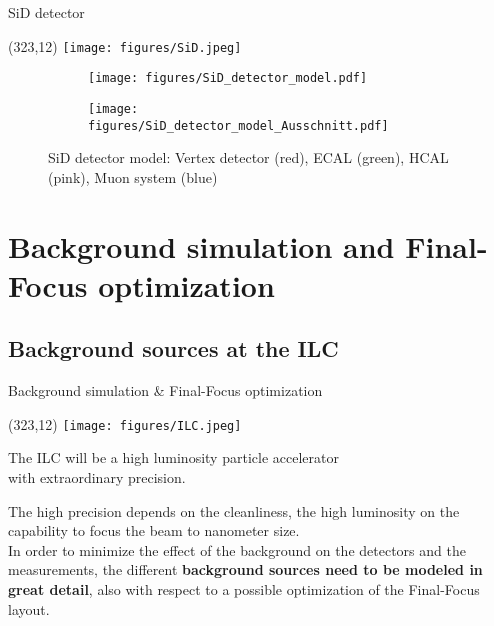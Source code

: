 \documentclass[xcolor={dvipsnames}]{beamer}
\newcommand{\sidlogo}{
  \setlength{\TPHorizModule}{1pt}
  \setlength{\TPVertModule}{1pt}
  \begin{textblock}{1}(323,12)
   \texttt{[image: figures/SiD.jpeg]}
  \end{textblock}
  }
\newcommand{\ilclogo}{
  \setlength{\TPHorizModule}{1pt}
  \setlength{\TPVertModule}{1pt}
  \begin{textblock}{1}(323,12)
   \texttt{[image: figures/ILC.jpeg]}
  \end{textblock}
}
\begin{document}
\begin{frame}{SiD detector}
\sidlogo
\begin{figure}[T]
\centering
\begin{subfigure}[b]{0.49\textwidth}
\centering
\texttt{[image: figures/SiD\_detector\_model.pdf]}
\end{subfigure}
\begin{subfigure}[b]{0.49\textwidth}
\centering
\texttt{[image: figures/SiD\_detector\_model\_Ausschnitt.pdf]}
\end{subfigure}
\caption{\small SiD detector model: Vertex detector (red), ECAL (green), HCAL (pink), Muon system (blue)}
\end{figure}
\end{frame}

\section{Background simulation and Final-Focus optimization}

\subsection{Background sources at the ILC}
\begin{frame}{Background simulation \& Final-Focus optimization}
\ilclogo
\begin{block}{}
\centering The ILC will be a \textcolor{Periwinkle}{high luminosity} particle accelerator \\with \textcolor{JungleGreen}{extraordinary precision}.
\end{block}
\vspace*{1cm}
\textcolor{JungleGreen}{The high precision depends on the cleanliness}, \textcolor{Periwinkle}{the high luminosity on the capability to focus the beam to nanometer size}.\\
\vspace*{0.5cm}
In order to minimize the effect of the background on the detectors and the measurements, the different \textbf{background sources need to be modeled in great detail}, also with respect to a possible optimization of the Final-Focus layout.
\end{frame}
\end{document}
